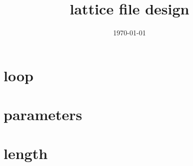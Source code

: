 \documentclass[10pt,CCT]{ctexart}
\begin{document}
\title{lattice file design}
 \date{\today}%

\maketitle
\thispagestyle{empty}


 
\section{loop}



\section{parameters}



\section{length}
\end{document}

